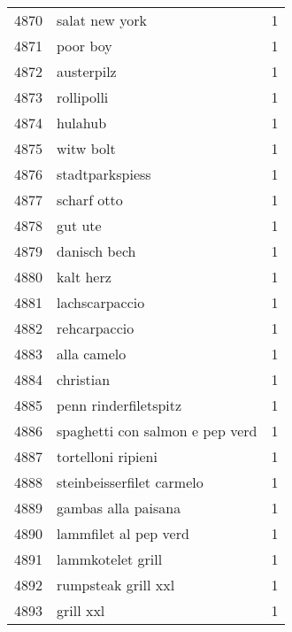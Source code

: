 \begin{tabular}{llr}
4870 &                                     salat new york &      1 \\
4871 &                                           poor boy &      1 \\
4872 &                                         austerpilz &      1 \\
4873 &                                         rollipolli &      1 \\
4874 &                                            hulahub &      1 \\
4875 &                                          witw bolt &      1 \\
4876 &                                    stadtparkspiess &      1 \\
4877 &                                        scharf otto &      1 \\
4878 &                                            gut ute &      1 \\
4879 &                                       danisch bech &      1 \\
4880 &                                          kalt herz &      1 \\
4881 &                                     lachscarpaccio &      1 \\
4882 &                                       rehcarpaccio &      1 \\
4883 &                                        alla camelo &      1 \\
4884 &                                          christian &      1 \\
4885 &                              penn rinderfiletspitz &      1 \\
4886 &                    spaghetti con salmon e pep verd &      1 \\
4887 &                                 tortelloni ripieni &      1 \\
4888 &                          steinbeisserfilet carmelo &      1 \\
4889 &                                gambas alla paisana &      1 \\
4890 &                              lammfilet al pep verd &      1 \\
4891 &                                  lammkotelet grill &      1 \\
4892 &                                rumpsteak grill xxl &      1 \\
4893 &                                          grill xxl &      1 \\

\end{tabular}
